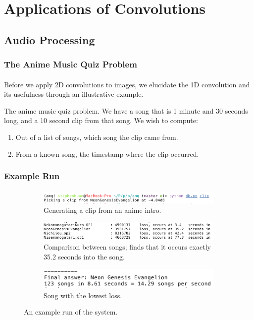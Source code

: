 \documentclass{beamer}                             %
\begin{document}
\section[Applications]{Applications of Convolutions}
\subsection[Audio]{Audio Processing}
\begin{frame}
\frametitle{The Anime Music Quiz Problem}
\framesubtitle{}
Before we apply 2D convolutions to images, we elucidate the 1D convolution
and its usefulness through an illustrative example.
\begin{exampleblock}{The anime music quiz problem.}
We have a song that is 1 minute and 30 seconds long,
and a 10 second clip from that song. We wish to compute:
\begin{enumerate}
  \item<2-> Out of a list of songs, which song the clip came from.
  \item<3-> From a known song, the timestamp where the clip occurred.
\end{enumerate}
\end{exampleblock}
\end{frame}

\begin{frame}
\frametitle{Example Run}
\framesubtitle{}
\begin{figure}[h!]
    \begin{subfigure}[h]{0.8 \textwidth}
      \includegraphics[scale=0.5]{clip.png}
      \caption{Generating a clip from an anime intro.}
    \end{subfigure}
    
    \begin{subfigure}[h]{0.48 \textwidth}
      \includegraphics[scale=0.3]{compare.png}
      \caption{Comparison between songs; finds that
      it occurs exactly 35.2 seconds into the song.}
    \end{subfigure}
    \hfill
    \begin{subfigure}[h]{0.48 \textwidth}
      \includegraphics[scale=0.3]{result.png}
      \caption{Song with the lowest loss.}
    \end{subfigure}
    \caption{An example run of the system.}
\end{figure}
\end{frame}
\end{document}
